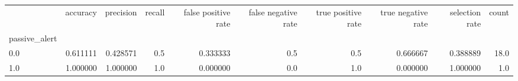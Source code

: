 \begin{tabular}{lrrrrrrrrr}
\toprule
{} &  accuracy &  precision &  recall &  false positive rate &  false negative rate &  true positive rate &  true negative rate &  selection rate &  count \\
passive\_alert &           &            &         &                      &                      &                     &                     &                 &        \\
\midrule
0.0           &  0.611111 &   0.428571 &     0.5 &             0.333333 &                  0.5 &                 0.5 &            0.666667 &        0.388889 &   18.0 \\
1.0           &  1.000000 &   1.000000 &     1.0 &             0.000000 &                  0.0 &                 1.0 &            0.000000 &        1.000000 &    1.0 \\
\bottomrule
\end{tabular}
